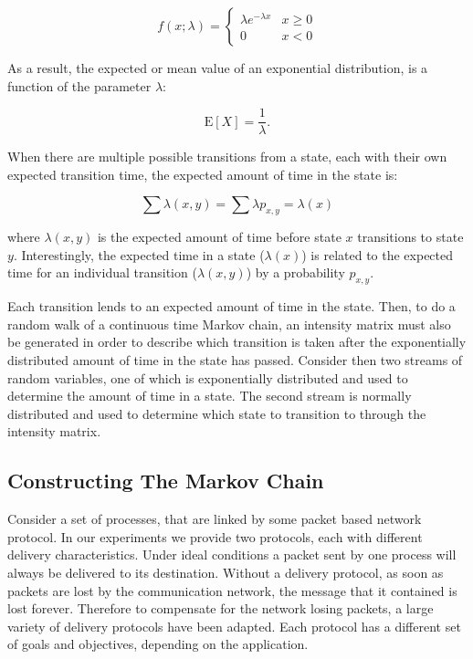 \begin{equation}
f(x;\lambda) = \begin{cases}
\lambda e^{-\lambda x} & x \ge 0 \\
0 & x < 0
\end{cases}
\end{equation}

As a result, the expected or mean value of an exponential distribution, is a function of
the parameter $\lambda$: \cite{MARKOV1}

\begin{equation}
\mathrm{E}[X] = \frac{1}{\lambda}. \!
\end{equation}

When there are multiple possible transitions from a state, each with their own expected transition time, the expected amount of time in the state is: \cite{MARKOV2}

\begin{equation}
\sum \lambda(x,y) = \sum \lambda p_{x,y} = \lambda(x)
\end{equation}

where $\lambda(x,y)$ is the expected amount of time before state $x$ transitions to state $y$. Interestingly, the expected time in a state ($\lambda(x)$) is related to the expected time for an individual transition ($\lambda(x,y)$) by a probability $p_{x,y}$.

Each transition lends to an expected amount of time in the state. Then, to do a random walk of a continuous time Markov chain, an intensity matrix must also be generated in order to describe which transition is taken after the exponentially distributed amount of time in the state has passed. Consider then two streams of random variables, one of which is exponentially distributed and used to determine the amount of time in a state. The second stream is normally distributed and used to determine which state to transition to through the intensity matrix.



\subsection{Constructing The Markov Chain}

Consider a set of processes, that are linked by some packet based network protocol. In our experiments we provide two protocols, each with different delivery characteristics. Under ideal conditions a packet sent by one process will always be delivered to its destination. Without a delivery protocol, as soon as packets are lost by the communication network, the message that it contained is lost forever. Therefore to compensate for the network losing packets, a large variety of delivery protocols have been adapted. Each protocol has a different set of goals and objectives, depending on the application.


